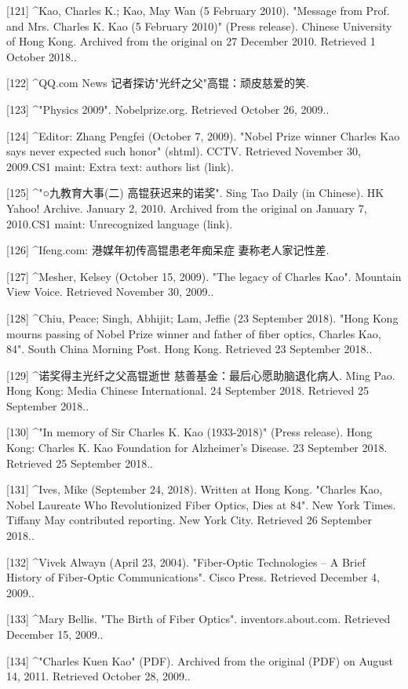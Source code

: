 [121]
^Kao, Charles K.; Kao, May Wan (5 February 2010). "Message from Prof. and Mrs. Charles K. Kao (5 February 2010)" (Press release). Chinese University of Hong Kong. Archived from the original on 27 December 2010. Retrieved 1 October 2018..

[122]
^QQ.com News 记者探访"光纤之父"高锟：顽皮慈爱的笑.

[123]
^"Physics 2009". Nobelprize.org. Retrieved October 26, 2009..

[124]
^Editor: Zhang Pengfei (October 7, 2009). "Nobel Prize winner Charles Kao says never expected such honor" (shtml). CCTV. Retrieved November 30, 2009.CS1 maint: Extra text: authors list (link).

[125]
^"○九教育大事(二) 高锟获迟来的诺奖". Sing Tao Daily (in Chinese). HK Yahoo! Archive. January 2, 2010. Archived from the original on January 7, 2010.CS1 maint: Unrecognized language (link).

[126]
^Ifeng.com: 港媒年初传高锟患老年痴呆症 妻称老人家记性差.

[127]
^Mesher, Kelsey (October 15, 2009). "The legacy of Charles Kao". Mountain View Voice. Retrieved November 30, 2009..

[128]
^Chiu, Peace; Singh, Abhijit; Lam, Jeffie (23 September 2018). "Hong Kong mourns passing of Nobel Prize winner and father of fiber optics, Charles Kao, 84". South China Morning Post. Hong Kong. Retrieved 23 September 2018..

[129]
^诺奖得主光纤之父高锟逝世 慈善基金：最后心愿助脑退化病人. Ming Pao. Hong Kong: Media Chinese International. 24 September 2018. Retrieved 25 September 2018..

[130]
^"In memory of Sir Charles K. Kao (1933-2018)" (Press release). Hong Kong: Charles K. Kao Foundation for Alzheimer’s Disease. 23 September 2018. Retrieved 25 September 2018..

[131]
^Ives, Mike (September 24, 2018). Written at Hong Kong. "Charles Kao, Nobel Laureate Who Revolutionized Fiber Optics, Dies at 84". New York Times. Tiffany May contributed reporting. New York City. Retrieved 26 September 2018..

[132]
^Vivek Alwayn (April 23, 2004). "Fiber-Optic Technologies – A Brief History of Fiber-Optic Communications". Cisco Press. Retrieved December 4, 2009..

[133]
^Mary Bellis. "The Birth of Fiber Optics". inventors.about.com. Retrieved December 15, 2009..

[134]
^"Charles Kuen Kao" (PDF). Archived from the original (PDF) on August 14, 2011. Retrieved October 28, 2009..